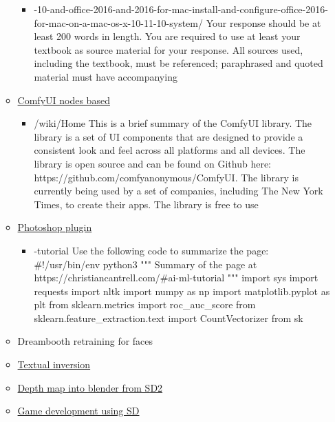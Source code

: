 \begin{itemize}
\begin{itemize}
    \begin{itemize}
    \tightlist
    \item
      -10-and-office-2016-and-2016-for-mac-install-and-configure-office-2016-for-mac-on-a-mac-os-x-10-11-10-system/
      Your response should be at least 200 words in length. You are
      required to use at least your textbook as source material for your
      response. All sources used, including the textbook, must be
      referenced; paraphrased and quoted material must have accompanying
    \end{itemize}
  \item
    \href{https://github.com/comfyanonymous/ComfyUI}{ComfyUI nodes
    based}

    \begin{itemize}
    \tightlist
    \item
      /wiki/Home This is a brief summary of the ComfyUI library. The
      library is a set of UI components that are designed to provide a
      consistent look and feel across all platforms and all devices. The
      library is open source and can be found on Github here:
      https://github.com/comfyanonymous/ComfyUI. The library is
      currently being used by a set of companies, including The New York
      Times, to create their apps. The library is free to use
    \end{itemize}
  \item
    \href{https://christiancantrell.com/\#ai-ml}{Photoshop plugin}

    \begin{itemize}
    \tightlist
    \item
      -tutorial Use the following code to summarize the page:
      \#!/usr/bin/env python3 """ Summary of the page at
      https://christiancantrell.com/\#ai-ml-tutorial """ import sys
      import requests import nltk import numpy as np import
      matplotlib.pyplot as plt from sklearn.metrics import
      roc\_auc\_score from sklearn.feature\_extraction.text import
      CountVectorizer from sk
    \end{itemize}
  \item
    Dreambooth retraining for faces
  \item
    \href{https://www.reddit.com/r/StableDiffusion/comments/10gs4s2/new_expert_tutorial_for_textual_inversion_text/}{Textual
    inversion}
  \item
    \href{https://www.youtube.com/watch?v=AeDngG9kQNI}{Depth map into
    blender from SD2}
  \item
    \href{https://www.heroo.ai/}{Game development using SD}


\end{itemize}
\end{itemize}
